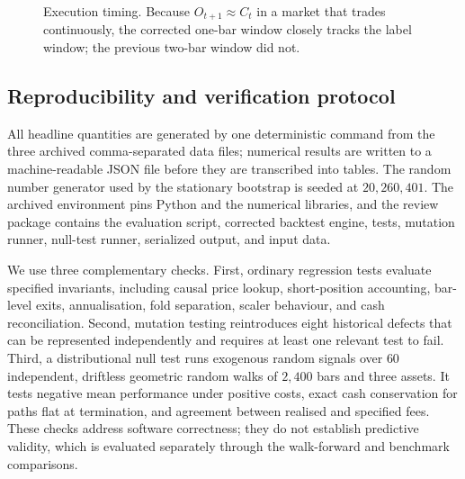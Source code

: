 \documentclass[preprint,12pt,authoryear]{elsarticle}
\begin{document}
\begin{figure}[t]\centering
{}
\caption{Execution timing. Because $O_{t+1} \approx C_t$ in a market that trades
continuously, the corrected one-bar window closely tracks the label window; the
previous two-bar window did not.}
\label{fig:timing}
\end{figure}

\subsection{Reproducibility and verification protocol}

All headline quantities are generated by one deterministic command from the
three archived comma-separated data files; numerical results are written to a
machine-readable JSON file before they are transcribed into tables. The random
number generator used by the stationary bootstrap is seeded at $20{,}260{,}401$.
The archived environment pins Python and the numerical libraries, and the
review package contains the evaluation script, corrected backtest engine,
tests, mutation runner, null-test runner, serialized output, and input data.

We use three complementary checks. First, ordinary regression tests evaluate
specified invariants, including causal price lookup, short-position accounting,
bar-level exits, annualisation, fold separation, scaler behaviour, and cash
reconciliation. Second, mutation testing reintroduces eight historical defects
that can be represented independently and requires at least one relevant test
to fail. Third, a distributional null test runs exogenous random signals over
$60$ independent, driftless geometric random walks of $2{,}400$ bars and three
assets. It tests negative mean performance under positive costs, exact cash
conservation for paths flat at termination, and agreement between realised and
specified fees. These checks address software correctness; they do not establish
predictive validity, which is evaluated separately through the walk-forward and
benchmark comparisons.
\end{document}
